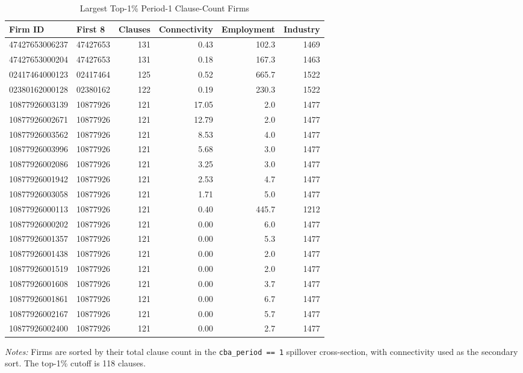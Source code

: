 \begin{table}[!htbp]
\centering
\caption{Largest Top-1\% Period-1 Clause-Count Firms}
\label{tab:numb_clause_outlier_firms}
\scriptsize
\begin{tabular}{llrrrr}
\toprule
Firm ID & First 8 & Clauses & Connectivity & Employment & Industry \\
\midrule
47427653006237 & 47427653 & 131 & 0.43 & 102.3 & 1469\\
47427653000204 & 47427653 & 131 & 0.18 & 167.3 & 1463\\
02417464000123 & 02417464 & 125 & 0.52 & 665.7 & 1522\\
02380162000128 & 02380162 & 122 & 0.19 & 230.3 & 1522\\
10877926003139 & 10877926 & 121 & 17.05 & 2.0 & 1477\\
10877926002671 & 10877926 & 121 & 12.79 & 2.0 & 1477\\
10877926003562 & 10877926 & 121 & 8.53 & 4.0 & 1477\\
10877926003996 & 10877926 & 121 & 5.68 & 3.0 & 1477\\
10877926002086 & 10877926 & 121 & 3.25 & 3.0 & 1477\\
10877926001942 & 10877926 & 121 & 2.53 & 4.7 & 1477\\
10877926003058 & 10877926 & 121 & 1.71 & 5.0 & 1477\\
10877926000113 & 10877926 & 121 & 0.40 & 445.7 & 1212\\
10877926000202 & 10877926 & 121 & 0.00 & 6.0 & 1477\\
10877926001357 & 10877926 & 121 & 0.00 & 5.3 & 1477\\
10877926001438 & 10877926 & 121 & 0.00 & 2.0 & 1477\\
10877926001519 & 10877926 & 121 & 0.00 & 2.0 & 1477\\
10877926001608 & 10877926 & 121 & 0.00 & 3.7 & 1477\\
10877926001861 & 10877926 & 121 & 0.00 & 6.7 & 1477\\
10877926002167 & 10877926 & 121 & 0.00 & 5.7 & 1477\\
10877926002400 & 10877926 & 121 & 0.00 & 2.7 & 1477\\
\bottomrule
\end{tabular}
\begin{minipage}{\linewidth}
\footnotesize\vspace{4pt}
\textit{Notes:} Firms are sorted by their total clause count in the \texttt{cba\_period == 1} spillover cross-section, with connectivity used as the secondary sort. The top-1\% cutoff is 118 clauses.
\end{minipage}
\end{table}

